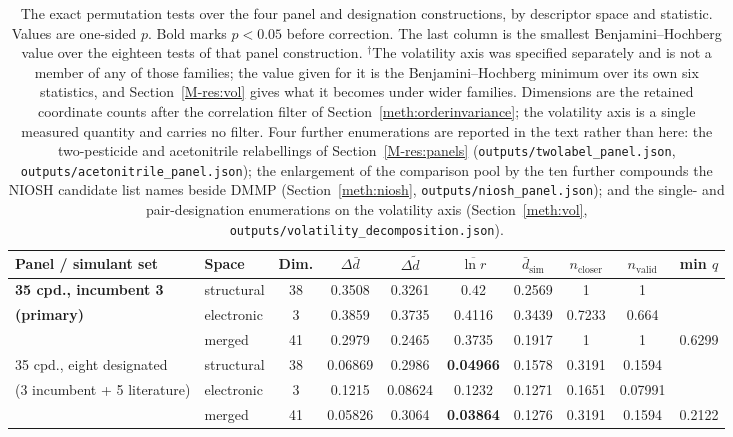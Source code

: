 \begin{table}[htb]
\centering
\caption{The exact permutation tests over the four panel and designation
constructions, by descriptor space and statistic. Values are one-sided $p$.
Bold marks $p<0.05$ before correction. The last column is the smallest
Benjamini--Hochberg value over the eighteen tests of that panel construction.
$^{\dagger}$The volatility axis was specified separately and is not a member of
any of those families; the value given for it is the Benjamini--Hochberg
minimum over its own six statistics, and
Section~\ref{M-res:vol} gives what it becomes under wider families.
Dimensions are the retained coordinate counts after the correlation filter of
Section~\ref{meth:orderinvariance}; the volatility axis is a single measured
quantity and carries no filter. Four further enumerations are reported in the
text rather than here: the two-pesticide and acetonitrile relabellings of
Section~\ref{M-res:panels}
(\texttt{outputs/twolabel\_panel.json}, \texttt{outputs/acetonitrile\_panel.json});
the enlargement of the comparison pool by the ten further compounds the
NIOSH candidate list names beside DMMP (Section~\ref{meth:niosh},
\texttt{outputs/niosh\_panel.json}); and the single- and pair-designation
enumerations on the volatility axis (Section~\ref{meth:vol},
\texttt{outputs/volatility\_decomposition.json}).}
\label{tab:ablation}
\footnotesize
\setlength{\tabcolsep}{3pt}
\begin{tabular}{llcccccccc}
\hline
Panel / simulant set & Space & Dim. & $\Delta\bar{d}$ & $\Delta\tilde{d}$ &
$\overline{\ln r}$ & $\bar{d}_\mathrm{sim}$ & $n_\mathrm{closer}$ &
$n_\mathrm{valid}$ & min $q$ \\
\hline
\textbf{35 cpd., incumbent 3} & structural  & 38 & 0.3508 & 0.3261 & 0.42 & 0.2569 & 1 & 1 &  \\
\textbf{(primary)}     & electronic  &  3 & 0.3859 & 0.3735 & 0.4116 & 0.3439 & 0.7233 & 0.664 &  \\
                       & merged      & 41 & 0.2979 & 0.2465 & 0.3735 & 0.1917 & 1 & 1 & 0.6299 \\
\hline
35 cpd., eight designated & structural  & 38 & 0.06869 & 0.2986 & \textbf{0.04966} & 0.1578 & 0.3191 & 0.1594 &  \\
\quad (3 incumbent + 5 literature) & electronic  &  3 & 0.1215 & 0.08624 & 0.1232 & 0.1271 & 0.1651 & 0.07991 &  \\
                       & merged      & 41 & 0.05826 & 0.3064 & \textbf{0.03864} & 0.1276 & 0.3191 & 0.1594 & 0.2122 \\

\end{tabular}
\end{table}
